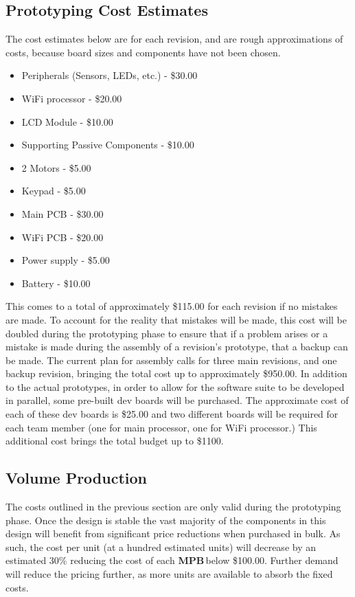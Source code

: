 \documentclass[letterpaper]{article}
\newcommand{\MPB}{\textbf{MPB}\,}
\begin{document}
\subsection{Prototyping Cost Estimates}
The cost estimates below are for each revision, and are rough approximations of costs, because board sizes and components have not been chosen.
\begin{multicols}{2}
\begin{itemize}
	\item Peripherals (Sensors, LEDs, etc.) - \$30.00
    \item WiFi processor - \$20.00
    \item LCD Module - \$10.00
    \item Supporting Passive Components - \$10.00
    \item 2 Motors - \$5.00
    \item Keypad - \$5.00
    \item Main PCB - \$30.00
    \item WiFi PCB - \$20.00
    \item Power supply - \$5.00
    \item Battery - \$10.00
\end{itemize}
\end{multicols}

This comes to a total of approximately \$115.00 for each revision if no mistakes are made. To account for the reality that mistakes will be made, this cost will be doubled during the prototyping phase to ensure that if a problem arises or a mistake is made during the assembly of a revision's prototype, that a backup can be made. The current plan for assembly calls for three main revisions, and one backup revision, bringing the total cost up to approximately \$950.00. In addition to the actual prototypes, in order to allow for the software suite to be developed in parallel, some pre-built dev boards will be purchased. The approximate cost of each of these dev boards is \$25.00 and two different boards will be required for each team member (one for main processor, one for WiFi processor.) This additional cost brings the total budget up to \$1100.

\subsection{Volume Production}
The costs outlined in the previous section are only valid during the prototyping phase. Once the design is stable the vast majority of the components in this design will benefit from significant price reductions when purchased in bulk. As such, the cost per unit (at a hundred estimated units) will decrease by an estimated 30\% reducing the cost of each \MPB below \$100.00. Further demand will reduce the pricing further, as more units are available to absorb the fixed costs.
\end{document}
